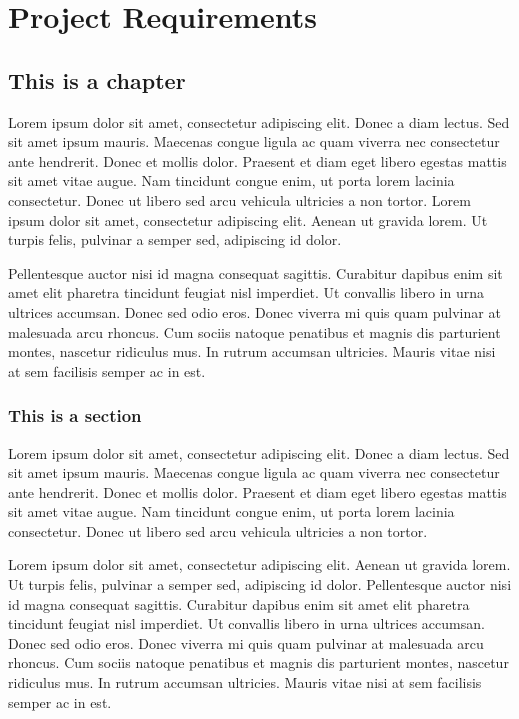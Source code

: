 \part{Project Requirements}

\chapter{This is a chapter}
Lorem ipsum dolor sit amet, consectetur adipiscing elit. Donec a diam lectus.
Sed sit amet ipsum mauris. Maecenas congue ligula ac quam viverra nec
consectetur ante hendrerit. Donec et mollis dolor. Praesent et diam eget libero
egestas mattis sit amet vitae augue. Nam tincidunt congue enim, ut porta lorem
lacinia consectetur. Donec ut libero sed arcu vehicula ultricies a non tortor.
Lorem ipsum dolor sit amet, consectetur adipiscing elit. Aenean ut gravida 
lorem. Ut turpis felis, pulvinar a semper sed, adipiscing id dolor.

Pellentesque auctor nisi id magna consequat sagittis. Curabitur dapibus enim
sit amet elit pharetra tincidunt feugiat nisl imperdiet. Ut convallis libero in
urna ultrices accumsan. Donec sed odio eros. Donec viverra mi quis quam
pulvinar at malesuada arcu rhoncus. Cum sociis natoque penatibus et magnis dis
parturient montes, nascetur ridiculus mus. In rutrum accumsan ultricies. Mauris
vitae nisi at sem facilisis semper ac in est.

\section{This is a section}
Lorem ipsum dolor sit amet, consectetur adipiscing elit. Donec a diam lectus.
Sed sit amet ipsum mauris. Maecenas congue ligula ac quam viverra nec
consectetur ante hendrerit. Donec et mollis dolor. Praesent et diam eget libero
egestas mattis sit amet vitae augue. Nam tincidunt congue enim, ut porta lorem
lacinia consectetur. Donec ut libero sed arcu vehicula ultricies a non tortor.

Lorem ipsum dolor sit amet, consectetur adipiscing elit. Aenean ut gravida 
lorem. Ut turpis felis, pulvinar a semper sed, adipiscing id dolor.
Pellentesque auctor nisi id magna consequat sagittis. Curabitur dapibus enim
sit amet elit pharetra tincidunt feugiat nisl imperdiet. Ut convallis libero in
urna ultrices accumsan. Donec sed odio eros. Donec viverra mi quis quam
pulvinar at malesuada arcu rhoncus. Cum sociis natoque penatibus et magnis dis
parturient montes, nascetur ridiculus mus. In rutrum accumsan ultricies. Mauris
vitae nisi at sem facilisis semper ac in est.


